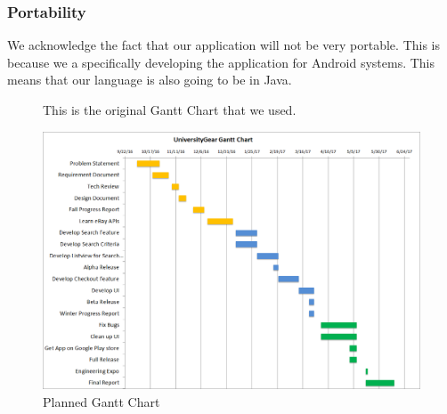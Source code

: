 \documentclass[journal,compsoc, 10pt, draftclsnofoot, onecolumn]{IEEEtran}
\begin{document}
\subsubsection*{Portability}

We acknowledge the fact that our application will not be very portable. This is 
because we a specifically developing the application for Android systems. This 
means that our language is also going to be in Java.

\begin{figure}[t]
This is the original Gantt Chart that we used.
\centering
\caption{Planned Gantt Chart}
\includegraphics[angle=90,scale=.60]{ganttChart}
\end{figure}
\FloatBarrier
\end{document}
